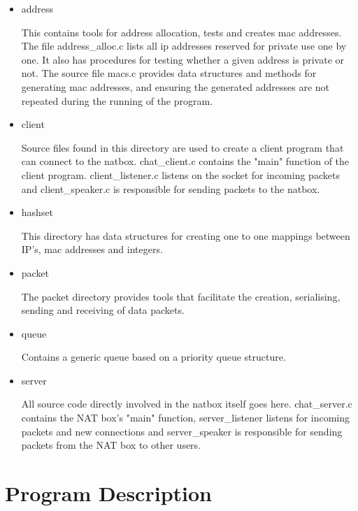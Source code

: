 \documentclass{article}
\begin{document}
\begin{itemize}

    \item address
    
    This contains tools for address allocation, tests and creates mac addresses. The file address\_alloc.c lists all ip addresses reserved for private use one by one.  It also has procedures for testing whether a given address is private or not. The source file macs.c provides data structures and methods for generating mac addresses, and ensuring the generated addresses are not repeated during the running of the program.  
    
    \item client
    
    Source files found in this directory are used to create a client program that can connect to the natbox.  chat\_client.c contains the "main" function of the client program.  client\_listener.c listens on the socket for incoming packets and client\_speaker.c is responsible for sending packets to the natbox.  
    
    \item hashset
    
    This directory has data structures for creating one to one mappings between IP's, mac addresses and integers.  
    
    \item packet
    
    The packet directory provides tools that facilitate the creation, serialising, sending and receiving of data packets.  
    
    \item queue
    
    Contains a generic queue based on a priority queue structure. 
    
    \item server
    
    All source code directly involved in the natbox itself goes here.  chat\_server.c contains the NAT box's "main" function, server\_listener listens for incoming packets and new connections and server\_speaker is responsible for sending packets from the NAT box to other users.
    
\end{itemize}


\section{Program Description}
\end{document}
